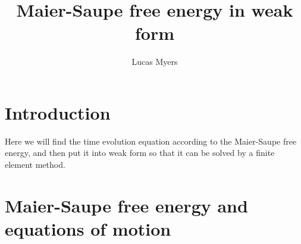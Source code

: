 \documentclass[reqno]{article}
\begin{document}
	\title{Maier-Saupe free energy in weak form}
	\author{Lucas Myers}
	\maketitle
	
	\section{Introduction}
	Here we will find the time evolution equation according to the Maier-Saupe free energy, and then put it into weak form so that it can be solved by a finite element method.
	
	\section{Maier-Saupe free energy and equations of motion}
	
\end{document}
